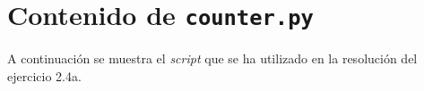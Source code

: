 \appendix
\chapter{Contenido de \texttt{counter.py}}
A continuación se muestra el \textit{script} que se ha utilizado en la resolución del ejercicio 2.4a.

